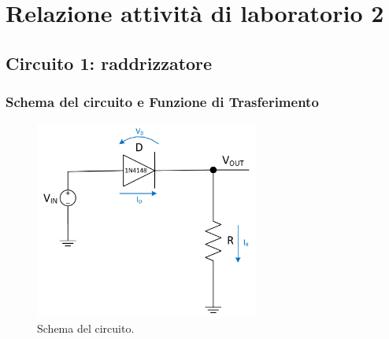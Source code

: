 \documentclass{report}
\begin{document}
\addtocounter{chapter}{+1}
	\begin{frontespizio}
		\Margini{3cm}{3cm}{3cm}{3cm}
		\Punteggiatura{}
		\begin{Preambolo*}
			\usepackage[italian]{babel}
			\usepackage[T1]{fontenc}
			\usepackage[utf8]{inputenc}
			\usepackage{microtype}
			\usepackage{lmodern}
			\graphicspath{{img/}}
			
			\renewcommand{\frontinstitutionfont}{\fontsize{14}{17}\bfseries\scshape}
			\renewcommand{\fronttitlefont}{\fontsize{17}{21}\bfseries\scshape}
			\renewcommand{\frontfootfont}{\fontsize{12}{14}\bfseries\scshape}
		\end{Preambolo*}
	\end{frontespizio}

\newpage
\null
\thispagestyle{empty}
\newpage

\chapter{Relazione attività di laboratorio 2}
\section{Circuito 1: raddrizzatore}
\subsection{Schema del circuito e Funzione di Trasferimento}
\begin{figure}[h]
	\centering
	\includegraphics[height=6.5cm]{immagini/schema1}
	\caption{Schema del circuito.}
	\label{figura:schema1}
\end{figure}
\end{document}
